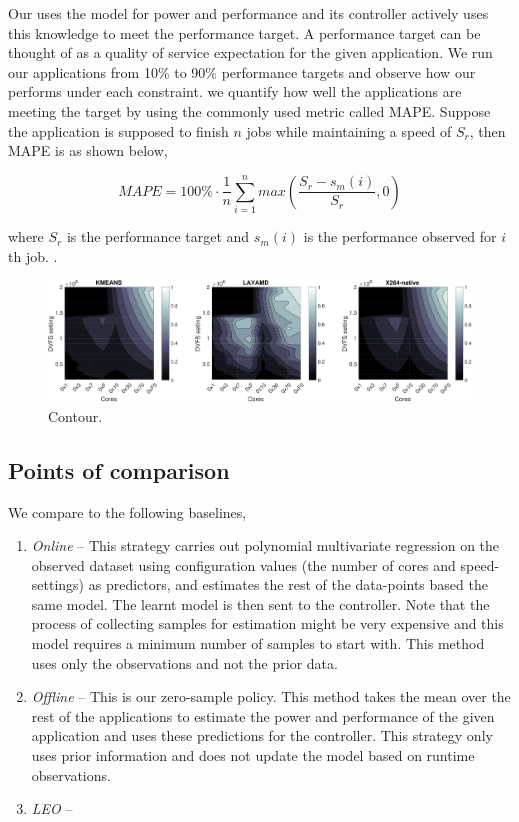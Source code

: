 Our \SYSTEM{} uses the model for power and performance and its controller actively uses this knowledge to meet the performance target. A performance target can be thought of as a quality of service expectation for the given application. We run our applications from 10\% to 90\% performance targets and observe how our \SYSTEM{} performs under each constraint. we quantify how well the applications are meeting the target by using the commonly used metric called MAPE. Suppose the application is supposed to finish $n$ jobs while maintaining a speed of $S_r$, then MAPE is as shown below,

\begin{equation}
MAPE = 100\% \cdot \frac{1}{n} \sum\limits_{i=1}^{n} max \left( \frac{S_{r} - s_m(i)}{S_r},0 \right)
\end{equation}

where $S_{r}$ is the performance target and $s_m(i)$ is the performance observed for $i$th job.
.
\begin{figure}
\includegraphics[width=\columnwidth]{figures/performance-contour3.pdf}
\caption{Contour.}
  \label{fig:contour}
\end{figure}
\subsection{Points of comparison}

We compare \SYSTEM{} to the following baselines,

\begin{enumerate}
\item \textit{Online} -- This strategy carries out polynomial
  multivariate regression on the observed dataset using configuration
  values (the number of cores and speed-settings) as
  predictors, and estimates the rest of the data-points based the same
  model. The learnt model is then sent to the controller. Note that the process of collecting samples for estimation might be very expensive and this model requires a minimum number of samples to start with. This method uses only the observations and
  not the prior data.
\item \textit{Offline} -- This is our zero-sample policy. This method takes the mean over the rest of the applications to estimate the power and performance of the given application and uses these predictions for the controller.
  This strategy only uses prior information and does not update the model
  based on runtime observations.

\item \textit{LEO} -- 
\end{enumerate}


